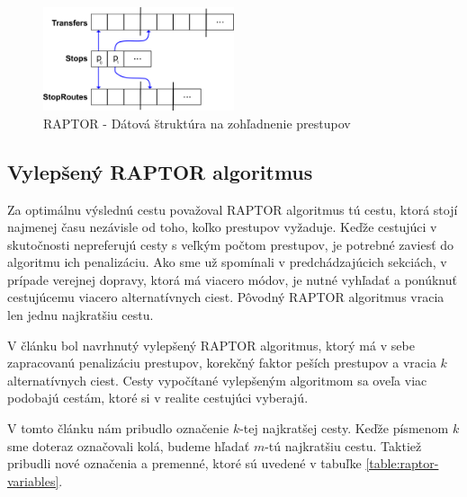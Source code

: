 \begin{figure}[H]
\centerline{\includegraphics[width=0.5\textwidth]{images/raptor-structure2}}
\caption[RAPTOR - Dátová štruktúra na zohľadnenie prestupov]{RAPTOR - Dátová štruktúra na zohľadnenie prestupov}
\label{fig:raptor-structure2}
\end{figure}

\subsection{Vylepšený RAPTOR algoritmus}
\label{sec:raptor-improved}
Za optimálnu výslednú cestu považoval RAPTOR algoritmus tú cestu, ktorá stojí najmenej času nezávisle od toho, koľko prestupov vyžaduje. Keďže cestujúci v skutočnosti nepreferujú cesty s veľkým počtom prestupov, je potrebné zaviesť do algoritmu ich penalizáciu. Ako sme už spomínali v predchádzajúcich sekciách, v prípade verejnej dopravy, ktorá má viacero módov, je nutné vyhľadať a ponúknuť cestujúcemu viacero alternatívnych ciest. Pôvodný RAPTOR algoritmus vracia len jednu najkratšiu cestu. 

V článku \cite{improvedRaptor} bol navrhnutý vylepšený RAPTOR algoritmus, ktorý má v sebe zapracovanú penalizáciu prestupov, korekčný faktor peších prestupov a vracia $k$ alternatívnych ciest. Cesty vypočítané vylepšeným algoritmom sa oveľa viac podobajú cestám, ktoré si v realite cestujúci vyberajú.

V tomto článku nám pribudlo označenie $k$-tej najkratšej cesty. Keďže písmenom $k$ sme doteraz označovali kolá, budeme hľadať $m$-tú najkratšiu cestu. Taktiež pribudli nové označenia a premenné, ktoré sú uvedené v tabuľke \ref{table:raptor-variables}.

